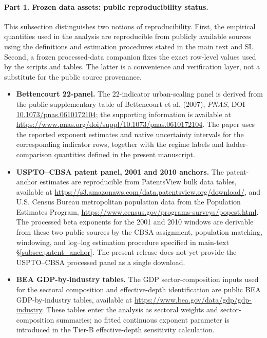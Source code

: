 \paragraph{Part 1. Frozen data assets: public reproducibility status.}
This subsection distinguishes two notions of reproducibility. First, the empirical quantities used in the analysis are reproducible from publicly available sources using the definitions and estimation procedures stated in the main text and SI. Second, a frozen processed-data companion fixes the exact row-level values used by the scripts and tables. The latter is a convenience and verification layer, not a substitute for the public source provenance.

\begin{itemize}
    \item \textbf{Bettencourt 22-panel.} The 22-indicator urban-scaling panel is derived from the public supplementary table of Bettencourt et al. (2007), \emph{PNAS}, DOI \href{https://doi.org/10.1073/pnas.0610172104}{10.1073/pnas.0610172104}; the supporting information is available at \url{https://www.pnas.org/doi/suppl/10.1073/pnas.0610172104}. The paper uses the reported exponent estimates and native uncertainty intervals for the corresponding indicator rows, together with the regime labels and ladder-comparison quantities defined in the present manuscript.

    \item \textbf{USPTO--CBSA patent panel, 2001 and 2010 anchors.} The patent-anchor estimates are reproducible from PatentsView bulk data tables, available at \url{https://s3.amazonaws.com/data.patentsview.org/download/}, and U.S. Census Bureau metropolitan population data from the Population Estimates Program, \url{https://www.census.gov/programs-surveys/popest.html}. The processed beta exponents for the 2001 and 2010 windows are derivable from these two public sources by the CBSA assignment, population matching, windowing, and log--log estimation procedure specified in main-text \S\ref{subsec:patent_anchor}. The present release does not yet provide the USPTO--CBSA processed panel as a single download.

    \item \textbf{BEA GDP-by-industry tables.} The GDP sector-composition inputs used for the sectoral composition and effective-depth identification are public BEA GDP-by-industry tables, available at \url{https://www.bea.gov/data/gdp/gdp-industry}. These tables enter the analysis as sectoral weights and sector-composition summaries; no fitted continuous exponent parameter is introduced in the Tier-B effective-depth sensitivity calculation.


\end{itemize}
